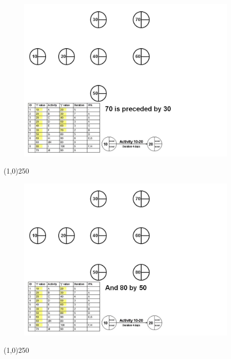 \begin{frame}
\begin{figure}
	\centering
		\includegraphics[width = 10.5cm]{oldnotes/Slide87.jpg}
\end{figure}
\end{frame}
\begin{center}\line(1,0){250}\end{center}


\begin{frame}
\begin{figure}
	\centering
		\includegraphics[width = 10.5cm]{oldnotes/Slide88.jpg}
\end{figure}
\end{frame}
\begin{center}\line(1,0){250}\end{center}


